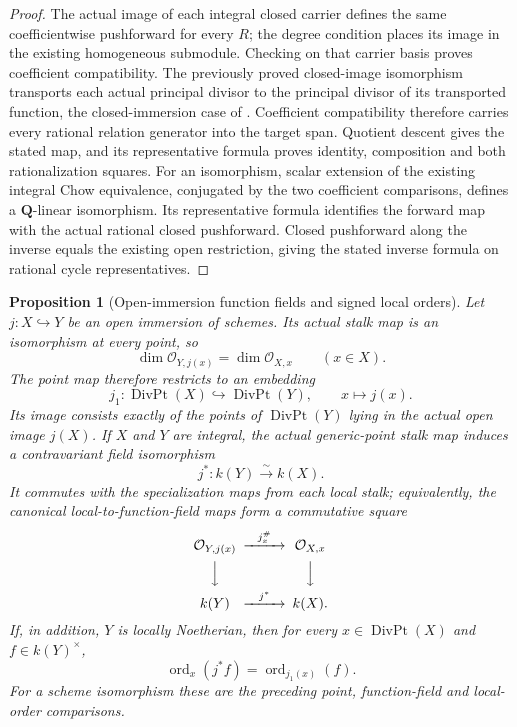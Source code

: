 \documentclass[11pt]{article}
\newtheorem{proposition}[theorem]{Proposition}
\theoremstyle{definition}
\theoremstyle{remark}
\begin{document}
\begin{proof}
The actual image of each integral closed carrier defines the same
coefficientwise pushforward for every \(R\); the degree condition
places its image in the existing homogeneous submodule. Checking
on that carrier basis proves coefficient compatibility. The
previously proved closed-image isomorphism transports each actual
principal divisor to the principal divisor of its transported
function, the closed-immersion case of
\cite{StacksRationalEquivalenceProperPushforward}.
Coefficient compatibility therefore carries every rational relation
generator into the target span. Quotient descent gives the stated
map, and its representative formula proves identity, composition
and both rationalization squares. For an isomorphism, scalar
extension of the existing integral Chow equivalence, conjugated by
the two coefficient comparisons, defines a \(\mathbf Q\)-linear isomorphism.
Its representative formula identifies the forward map with the
actual rational closed pushforward. Closed pushforward along the
inverse equals the existing open restriction, giving the stated
inverse formula on rational cycle representatives.
\end{proof}

\begin{proposition}[Open-immersion function fields and signed local orders]
\label{prop:open-function-field-order}
Let \(j:X\hookrightarrow Y\) be an open immersion of schemes.
Its actual stalk map is an isomorphism at every point, so
\[
 \dim\mathcal O_{Y,j(x)}=\dim\mathcal O_{X,x}
       \qquad(x\in X).
\]
The point map therefore restricts to an embedding
\[
 j_1:\operatorname{DivPt}(X)\hookrightarrow\operatorname{DivPt}(Y),
 \qquad x\longmapsto j(x).
\]
Its image consists exactly of the points of
\(\operatorname{DivPt}(Y)\) lying in the actual open image \(j(X)\).
If \(X\) and \(Y\) are integral, the actual generic-point stalk
map induces a contravariant field isomorphism
\[
 j^*:k(Y)\xrightarrow{\sim}k(X).
\]
It commutes with the specialization maps from each local stalk;
equivalently, the canonical local-to-function-field maps form a
commutative square
\[
\begin{CD}
 \mathcal O_{Y,j(x)} @>{j_x^{\#}}>> \mathcal O_{X,x}\\
 @VVV @VVV\\
 k(Y) @>{j^*}>> k(X).
\end{CD}
\]
If, in addition, \(Y\) is locally Noetherian, then for every
\(x\in\operatorname{DivPt}(X)\) and \(f\in k(Y)^\times\),
\[
 \operatorname{ord}_x(j^*f)
       =\operatorname{ord}_{j_1(x)}(f).
\]
For a scheme isomorphism these are the preceding point, function-field
and local-order comparisons.
\end{proposition}
\end{document}
